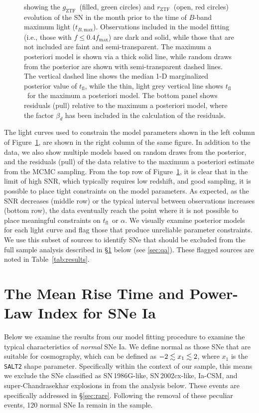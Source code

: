\documentclass[twocolumn]{./aastex63}
\newcommand{\rztf}{$r_\mathrm{ZTF}$}
\newcommand{\gztf}{$g_\mathrm{ZTF}$}
\newcommand{\tfl}{$t_\mathrm{fl}$}
\newcommand{\tbmax}{$t_{B,\mathrm{max}}$}
\begin{document}
\begin{figure}
{    showing the \gztf\ (filled, green circles) and \rztf\ (open, red circles)
    evolution of the SN in the month prior to the time of $B$-band maximum light
    (\tbmax). Observations included in the model fitting (i.e., those with $f
    \le 0.4 f_\mathrm{max}$) are dark and solid, while those that are not
    included are faint and semi-transparent. The maximum a posteriori model is
    shown via a thick solid line, while random draws from the posterior are
    shown with semi-transparent dashed lines. The vertical dashed line shows the
    median 1-D marginalized posterior value of \tfl, while the thin, light grey
    vertical line shows \tfl\ for the maximum a posteriori model. The bottom
    panel shows residuals (pull) relative to the maximum a posteriori model,
    where the factor $\beta_d$ has been included in the calculation of the
    residuals.}
    \label{fig:corner_LC}
\end{figure}

The light curves used to constrain the model parameters shown in the left column
of Figure~\ref{fig:corner_LC}, are shown in the right column of the same figure.
In addition to the data, we also show multiple models based on random draws from
the posterior, and the residuals (pull) of the data relative to the maximum a
posteriori estimate from the MCMC sampling. From the top row of
Figure~\ref{fig:corner_LC}, it is clear that in the limit of high SNR, which
typically requires low redshift, and good sampling, it is possible to place
tight constraints on the model parameters. As expected, as the SNR decreases
(middle row) or the typical interval between observations increases (bottom
row), the data eventually reach the point where it is not possible to place
meaningful constraints on \tfl\ or $\alpha$. We visually examine posterior
models for each light curve and flag those that produce unreliable parameter
constraints. We use this subset of sources to identify SNe that should be
excluded from the full sample analysis described in \S\ref{sec:mean_parameters}
below (see \ref{sec:qa}). These flagged sources are noted in
Table~\ref{tab:results}.

\section{The Mean Rise Time and Power-Law Index for SNe
Ia}\label{sec:mean_parameters}

Below we examine the results from our model fitting procedure to examine the
typical characteristics of \textit{normal} SNe Ia. We define normal as those SNe
that are suitable for cosmography, which can be defined as $-2 \lesssim x_1 \lesssim 2$,
where $x_1$ is the \texttt{SALT2} shape parameter. Specifically within the
context of our sample, this means we exclude the SNe classified as
SN\,1986G-like, SN\,2002cx-like, Ia-CSM, and super-Chandrasekhar explosions in
\citet{Yao19} from the analysis below. These events are specifically addressed
in \S\ref{sec:rare}. Following the removal of these peculiar events, 120 normal
SNe Ia remain in the sample.
\end{document}
